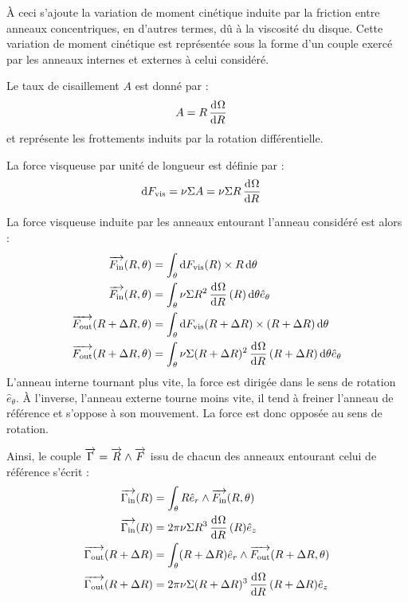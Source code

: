 \bigskip

À ceci s'ajoute la variation de moment cinétique induite par la friction entre anneaux concentriques, en d'autres termes, dû à
la viscosité du disque. Cette variation de moment cinétique est représentée sous la forme d'un couple exercé par les anneaux
internes et externes à celui considéré. 

Le taux de cisaillement $A$ est donné par : 
\begin{align}
A &= R \mathinner{ \dfrac{\operatorname{d \!}{^{}}\Omega}{\operatorname{d \!}{{R}^{}}} }
\end{align}
et représente les frottements induits par la rotation différentielle.

La force visqueuse par unité de longueur est définie par :
\begin{align}
\operatorname{d \!} F_\text{vis} &= \nu \Sigma A = \nu \Sigma R \mathinner{ \dfrac{\operatorname{d \!}{^{}}\Omega}{\operatorname{d \!}{{R}^{}}} }
\end{align}

La force visqueuse induite par les anneaux entourant l'anneau considéré est alors : 
\begin{subequations}
\begin{align}
\vect{F_\text{in}}(R, \theta) &= \int_\theta \dif F_\text{vis}(R) \times R\dif \theta \nonumber\\
\vect{F_\text{in}}(R, \theta)&= \int_\theta \nu \Sigma R^2 \dod{\Omega}{R}(R) \dif \theta\hat{e}_\theta\\
\vect{F_\text{out}}(R+\Delta R, \theta) &= \int_\theta  \dif F_\text{vis}(R+\Delta R) \times (R+\Delta R)\dif \theta\nonumber\\
\vect{F_\text{out}}(R+\Delta R, \theta)&= \int_\theta \nu \Sigma (R+\Delta R)^2 \dod{\Omega}{R}(R+\Delta R) \dif \theta \hat{e}_\theta
\end{align}
\end{subequations}
L'anneau interne tournant plus vite, la force est dirigée dans le sens de rotation $\hat{e}_\theta$. À l'inverse, l'anneau externe tourne moins vite, il tend à freiner l'anneau de référence et s'oppose à son mouvement. La force est donc opposée au sens de rotation.

\bigskip

Ainsi, le couple ${\overrightarrow{\Gamma}}={\overrightarrow{R}}\wedge{\overrightarrow{F}}$ issu de chacun des anneaux entourant celui de référence s'écrit :
\begin{subequations}
\begin{align}
\vect{\Gamma_\text{in}}(R) &= \int_\theta R\hat{e}_r\wedge\vect{F_\text{in}}(R, \theta)\nonumber\\
\vect{\Gamma_\text{in}}(R) &= 2\pi\nu \Sigma R^3 \dod{\Omega}{R}(R) \hat{e}_z\label{eq:G_in2}\\
\vect{\Gamma_\text{out}}(R+\Delta R) &= \int_\theta  (R+\Delta R)\hat{e}_r\wedge\vect{F_\text{out}}(R+\Delta R, \theta)\nonumber\\
\vect{\Gamma_\text{out}}(R+\Delta R) &= 2\pi\nu \Sigma (R+\Delta R)^3 \dod{\Omega}{R}(R+\Delta R) \hat{e}_z\label{eq:G_out2}
\end{align}\label{eq:J_torques2}
\end{subequations}

